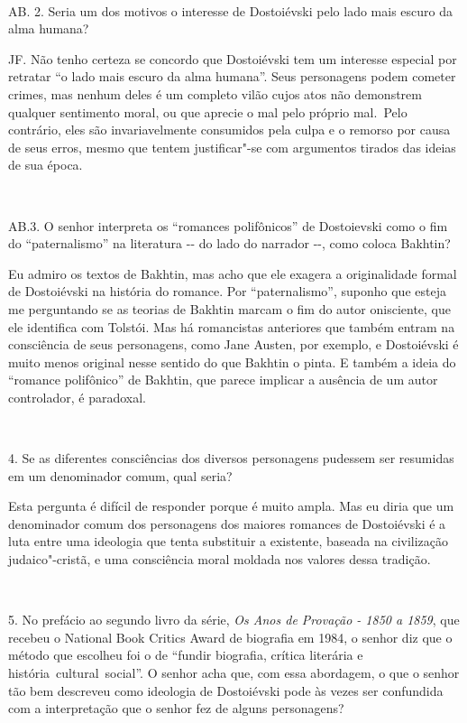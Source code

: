 ~

AB. 2. Seria um dos motivos o interesse de Dostoiévski pelo lado mais
escuro da alma humana?

JF. Não tenho certeza se concordo que Dostoiévski tem um interesse
especial por retratar ``o lado mais escuro da alma humana''. Seus
personagens podem cometer crimes, mas nenhum deles é um completo vilão
cujos atos não demonstrem qualquer sentimento moral, ou que aprecie o
mal pelo próprio mal.~Pelo contrário, eles são invariavelmente
consumidos pela culpa e o remorso por causa de seus erros, mesmo que
tentem justificar"-se com argumentos tirados das ideias de sua época.

~

AB.3. O senhor interpreta os ``romances polifônicos'' de Dostoievski como
o fim do ``paternalismo'' na literatura -\/- do lado do narrador -\/-,
como coloca Bakhtin?

Eu admiro os textos de Bakhtin, mas acho que ele exagera a originalidade
formal de Dostoiévski na história do romance. Por ``paternalismo'',
suponho que esteja me perguntando se as teorias de Bakhtin marcam o fim
do autor onisciente, que ele identifica com Tolstói. Mas há romancistas
anteriores que também entram na consciência de seus personagens, como
Jane Austen, por exemplo, e Dostoiévski é muito menos original nesse
sentido do que Bakhtin o pinta. E também a ideia do ``romance polifônico''
de Bakhtin, que parece implicar a ausência de um autor controlador, é
paradoxal.

~

4. Se as diferentes consciências dos diversos personagens pudessem ser
resumidas em um denominador comum, qual seria?

Esta pergunta é difícil de responder porque é muito ampla. Mas eu diria
que um denominador comum dos personagens dos maiores romances de
Dostoiévski é a luta entre uma ideologia que tenta substituir a
existente, baseada na civilização judaico"-cristã, e uma consciência
moral moldada nos valores dessa tradição.

~

5. No prefácio ao segundo livro da série, \emph{Os Anos de Provação - 1850 a
1859}, que recebeu o National Book Critics Award de biografia em 1984, o
senhor diz que o método que escolheu foi o de ``fundir biografia, crítica
literária e história~cultural~social''. O senhor acha que, com essa
abordagem, o que o senhor tão bem descreveu como ideologia de
Dostoiévski pode às vezes ser confundida com a interpretação que o
senhor fez de alguns personagens?

